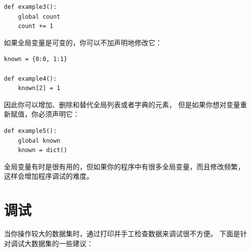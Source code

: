 
\begin{lstlisting}
def example3():
    global count
    count += 1
\end{lstlisting}

%

如果全局变量是可变的，你可以不加声明地修改它：


\begin{lstlisting}
known = {0:0, 1:1}

def example4():
    known[2] = 1
\end{lstlisting}

%

因此你可以增加、删除和替代全局列表或者字典的元素，
但是如果你想对变量重新赋值，你必须声明它：

\begin{lstlisting}
def example5():
    global known
    known = dict()
\end{lstlisting}

%

全局变量有时是很有用的，但如果你的程序中有很多全局变量，而且修改频繁，
这样会增加程序调试的难度。

\section{调试}


当你操作较大的数据集时，通过打印并手工检查数据来调试很不方便。
下面是针对调试大数据集的一些建议：


